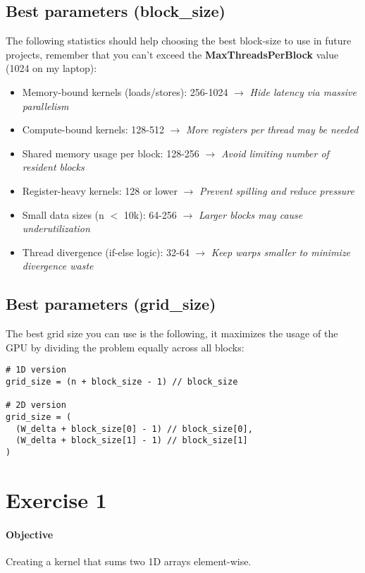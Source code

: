 \documentclass{article}
\begin{document}
\newpage

\subsection{Best parameters (block\_size)} The following statistics should help choosing the best block-size to use in future projects, remember that you can't exceed the \textbf{MaxThreadsPerBlock} value (1024 on my laptop):
\begin{itemize}
    \item Memory-bound kernels (loads/stores): 256-1024 $\longrightarrow$ \textit{Hide latency via massive parallelism}
    \item Compute-bound kernels: 128-512 $\longrightarrow$ \textit{More registers per thread may be needed}
    \item Shared memory usage per block: 128-256 $\longrightarrow$ \textit{Avoid limiting number of resident blocks}
    \item Register-heavy kernels: 128 or lower $\longrightarrow$ \textit{Prevent spilling and reduce pressure}
    \item Small data sizes (n $<$ 10k): 64-256 $\longrightarrow$ \textit{Larger blocks may cause underutilization}
    \item Thread divergence (if-else logic): 32-64 $\longrightarrow$ \textit{Keep warps smaller to minimize divergence waste}
\end{itemize}


\subsection{Best parameters (grid\_size)} The best grid size you can use is the following, it maximizes the usage of the GPU by dividing the problem equally across all blocks:
\begin{lstlisting}[caption=Determine grid size]
# 1D version
grid_size = (n + block_size - 1) // block_size 

# 2D version
grid_size = (
  (W_delta + block_size[0] - 1) // block_size[0],
  (W_delta + block_size[1] - 1) // block_size[1]
) 
\end{lstlisting}

\newpage

\section{Exercise 1}
\paragraph{Objective}
Creating a kernel that sums two 1D arrays element-wise.
\end{document}
